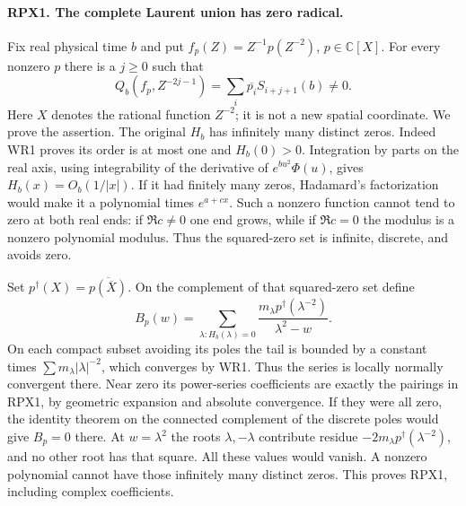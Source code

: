 \documentclass[11pt,a4paper]{article}
\theoremstyle{definition}\newtheorem{definition}[theorem]{Definition}
\begin{document}
\paragraph{RPX1. The complete Laurent union has zero radical.}
Fix real physical time $b$ and put
$f_p(Z)=Z^{-1}p(Z^{-2})$, $p\in\mathbb C[X]$. For every nonzero
$p$ there is a $j\ge0$ such that
\[
 Q_b(f_p,Z^{-2j-1})=\sum_i\overline{p_i}S_{i+j+1}(b)\ne0.
 \tag{RPX1}
\]
Here $X$ denotes the rational function $Z^{-2}$; it is not a new
spatial coordinate. We prove the assertion. The original $H_b$ has
infinitely many distinct zeros. Indeed WR1 proves its order is at
most one and $H_b(0)>0$. Integration by parts on the real axis,
using integrability of the derivative of $e^{bu^2}\Phi(u)$, gives
$H_b(x)=O_b(1/|x|)$. If it had finitely many zeros, Hadamard's
factorization would make it a polynomial times $e^{a+cx}$.
Such a nonzero function cannot tend to zero at both real ends:
if $\Re c\ne0$ one end grows, while if $\Re c=0$ the modulus
is a nonzero polynomial modulus. Thus the squared-zero set is
infinite, discrete, and avoids zero.

Set $p^\dagger(X)=\overline{p(\overline X)}$. On the complement
of that squared-zero set define
\[
 B_p(w)=\sum_{\lambda:H_b(\lambda)=0}
 \frac{m_\lambda p^\dagger(\lambda^{-2})}{\lambda^2-w}.
 \tag{RPX2}
\]
On each compact subset avoiding its poles the tail is bounded by
a constant times $\sum m_\lambda|\lambda|^{-2}$, which converges
by WR1. Thus the series is locally normally convergent there.
Near zero its power-series coefficients are exactly the pairings
in RPX1, by geometric expansion and absolute convergence.
If they were all zero, the identity theorem on the connected
complement of the discrete poles would give $B_p=0$ there.
At $w=\lambda^2$ the roots $\lambda,-\lambda$ contribute residue
$-2m_\lambda p^\dagger(\lambda^{-2})$, and no other root has that
square. All these values would vanish. A nonzero polynomial
cannot have those infinitely many distinct zeros. This proves
RPX1, including complex coefficients.
\end{document}
